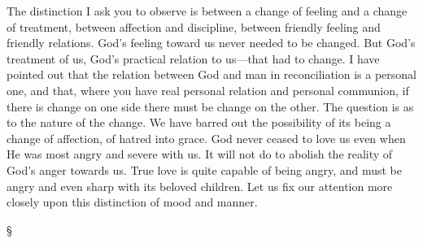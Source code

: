 \documentclass[12pt,letterpaper,oneside]{book}
\begin{document}
The distinction I ask you to observe is 
between a change of feeling and a change of 
treatment, between affection and discipline, 
between friendly feeling and friendly relations. 
God's feeling toward us never needed to be 
changed. But God's treatment of us, God's 
practical relation to us---that had to change. I 
have pointed out that the relation between God 
and man in reconciliation is a personal one, and 
that, where you have real personal relation 
and personal communion, if there is change on 
one side there must be change on the other. 
The question is as to the nature of the change. 
We have barred out the possibility of its being a 
change of affection, of hatred into grace. God 
never ceased to love us even when He was most 
angry and severe with us. It will not do to 
abolish the reality of God's anger towards 
us. True love is quite capable of being angry, 
and must be angry and even sharp with its 
beloved children. Let us fix our attention 
more closely upon this distinction of mood and 
manner. 

\begin{center}
\S
\end{center}
\end{document}
